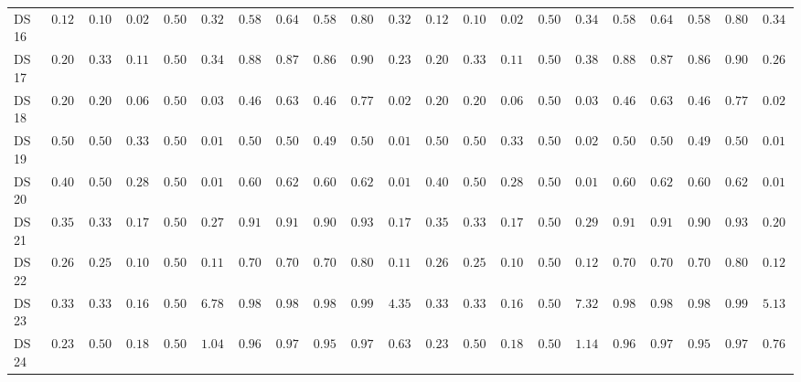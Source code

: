 {\begin{longtable}{|l|ccccc|ccccc|ccccc|ccccc|}
		DS 16 & $0.1200$ & $0.1000$ & $0.0214$ & $0.5000$ & $0.3294$ & $0.5800$ & $0.6467$ & $0.5825$ & $0.8037$ & $\boldsymbol{0.3276}$ & $0.1200$ & $0.1000$ & $0.0214$ & $0.5000$ & $0.3436$ & $0.5800$ & $0.6467$ & $0.5825$ & $0.8037$ & $0.3458$ \\
		DS 17 & $0.2075$ & $0.3333$ & $0.1146$ & $0.5000$ & $0.3427$ & $0.8868$ & $0.8758$ & $0.8678$ & $0.9068$ & $\boldsymbol{0.2362}$ & $0.2075$ & $0.3333$ & $0.1146$ & $0.5000$ & $0.3817$ & $0.8868$ & $0.8758$ & $0.8678$ & $0.9068$ & $0.2649$ \\
		DS 18 & $0.2000$ & $0.2000$ & $0.0667$ & $0.5000$ & $0.0337$ & $0.4667$ & $0.6333$ & $0.4689$ & $0.7708$ & $\boldsymbol{0.0211}$ & $0.2000$ & $0.2000$ & $0.0667$ & $0.5000$ & $0.0383$ & $\boldsymbol{0.4667}$ & $\boldsymbol{0.6333}$ & $\boldsymbol{0.4689}$ & $\boldsymbol{0.7708}$ & $0.0254$ \\
		DS 19 & $0.5000$ & $0.5000$ & $0.3333$ & $0.5000$ & $\boldsymbol{0.0155}$ & $0.5000$ & $0.5000$ & $0.4949$ & $0.5000$ & $0.0160$ & $0.5000$ & $0.5000$ & $0.3333$ & $0.5000$ & $0.0200$ & $0.5000$ & $0.5000$ & $0.4949$ & $0.5000$ & $0.0197$ \\
		DS 20 & $0.4000$ & $0.5000$ & $0.2857$ & $0.5000$ & $\boldsymbol{0.0142}$ & $0.6000$ & $0.6250$ & $0.6000$ & $0.6250$ & $0.0157$ & $0.4000$ & $0.5000$ & $0.2857$ & $0.5000$ & $0.0199$ & $0.6000$ & $0.6250$ & $0.6000$ & $0.6250$ & $0.0192$ \\
		DS 21 & $0.3556$ & $0.3333$ & $0.1749$ & $0.5000$ & $0.2722$ & $0.9111$ & $0.9119$ & $0.9094$ & $0.9339$ & $\boldsymbol{0.1711}$ & $0.3556$ & $0.3333$ & $0.1749$ & $0.5000$ & $0.2953$ & $0.9111$ & $0.9119$ & $0.9094$ & $0.9339$ & $0.2008$ \\
		DS 22 & $0.2667$ & $0.2500$ & $0.1053$ & $0.5000$ & $\boldsymbol{0.1138}$ & $0.7000$ & $0.7009$ & $0.7033$ & $0.8006$ & $0.1197$ & $0.2667$ & $0.2500$ & $0.1053$ & $0.5000$ & $0.1218$ & $0.7000$ & $0.7009$ & $0.7033$ & $0.8006$ & $0.1228$ \\
		DS 23 & $0.3348$ & $0.3333$ & $0.1672$ & $0.5000$ & $6.7857$ & $0.9871$ & $0.9872$ & $0.9875$ & $0.9904$ & $\boldsymbol{4.3542}$ & $0.3348$ & $0.3333$ & $0.1672$ & $0.5000$ & $7.3229$ & $0.9871$ & $0.9872$ & $0.9875$ & $0.9904$ & $5.1304$ \\
		DS 24 & $0.2308$ & $0.5000$ & $0.1875$ & $0.5000$ & $1.0447$ & $0.9670$ & $0.9786$ & $0.9557$ & $0.9786$ & $\boldsymbol{0.6326}$ & $0.2308$ & $0.5000$ & $0.1875$ & $0.5000$ & $1.1429$ & $\boldsymbol{0.9670}$ & $\boldsymbol{0.9786}$ & $\boldsymbol{0.9557}$ & $\boldsymbol{0.9786}$ & $0.7605$ \\

\end{longtable}}
